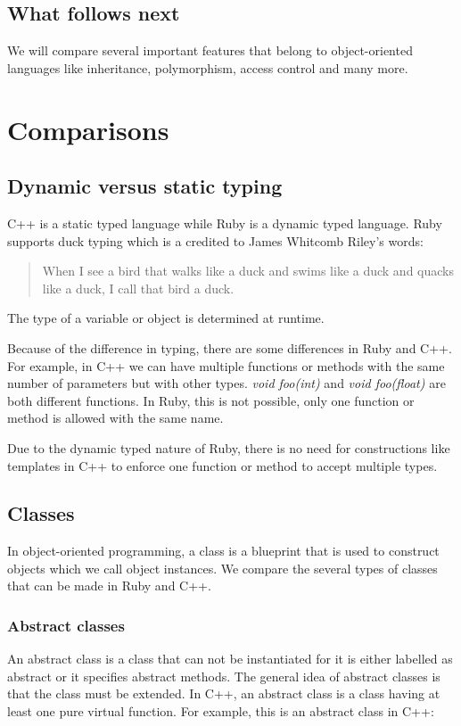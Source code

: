 \documentclass[10pt,a4paper,twocolumn]{article}
\begin{document}
\subsection{What follows next}
We will compare several important features that belong to object-oriented languages like inheritance, polymorphism, access control and many more.

\pagebreak
\section{Comparisons}

\subsection{Dynamic versus static typing}
C++ is a static typed language while Ruby is a dynamic typed language. Ruby supports duck typing which is a credited to James Whitcomb Riley's words:

\begin{quote}When I see a bird that walks like a duck and swims like a duck and quacks like a duck, I call that bird a duck.\end{quote}

The type of a variable or object is determined at runtime.

Because of the difference in typing, there are some differences in Ruby and C++. For example, in C++ we can have multiple functions or methods with the same number of parameters but with other types. \textit{void foo(int)} and \textit{void foo(float)} are both different functions. In Ruby, this is not possible, only one function or method is allowed with the same name.

Due to the dynamic typed nature of Ruby, there is no need for constructions like templates in C++ to enforce one function or method to accept multiple types.

\subsection{Classes}
In object-oriented programming, a class is a blueprint that is used to construct objects which we call object instances. We compare the several types of classes that can be made in Ruby and C++.

\subsubsection{Abstract classes}
An abstract class is a class that can not be instantiated for it is either labelled as abstract or it specifies abstract methods. The general idea of abstract classes is that the class must be extended. In C++, an abstract class is a class having at least one pure virtual function. For example, this is an abstract class in C++:
\end{document}
